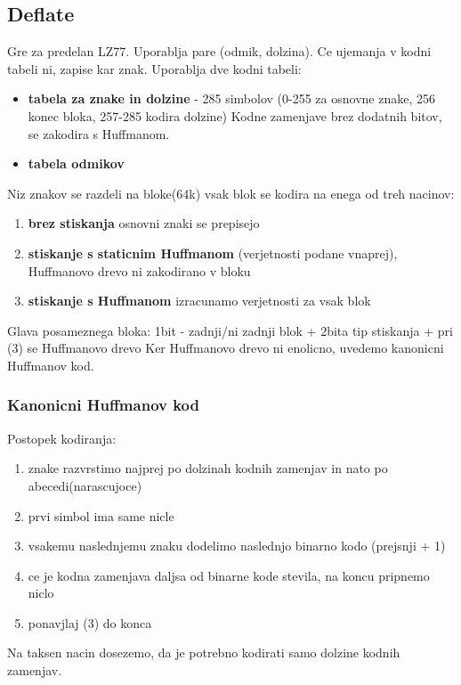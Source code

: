\documentclass{article}
\begin{document}
\begin{multicols}{2}
	\subsection{Deflate}
	Gre za predelan LZ77. Uporablja pare (odmik, dolzina). Ce ujemanja v kodni tabeli ni, zapise kar znak.
	Uporablja dve kodni tabeli:
	\begin{itemize}
		\item \textbf{tabela za znake in dolzine} - 285 simbolov
		      (0-255 za osnovne znake, 256 konec bloka, 257-285 kodira dolzine)
		      Kodne zamenjave brez dodatnih bitov, se zakodira s Huffmanom.
		\item \textbf{tabela odmikov}
	\end{itemize}
	Niz znakov se razdeli na bloke(64k)
	vsak blok se kodira na enega od treh nacinov:
	\begin{enumerate}
		\item \textbf{brez stiskanja} osnovni znaki se prepisejo
		\item \textbf{stiskanje s staticnim Huffmanom} (verjetnosti podane vnaprej), Huffmanovo drevo ni zakodirano v bloku
		\item \textbf{stiskanje s Huffmanom} izracunamo verjetnosti za vsak blok
	\end{enumerate}
	Glava posameznega bloka: 1bit - zadnji/ni zadnji blok + 2bita tip stiskanja + pri (3) se Huffmanovo drevo
	Ker Huffmanovo drevo ni enolicno, uvedemo kanonicni Huffmanov kod.

	\subsubsection{Kanonicni Huffmanov kod}
	Postopek kodiranja:
	\begin{enumerate}
		\item znake razvrstimo najprej po dolzinah kodnih zamenjav in nato po abecedi(narascujoce)
		\item prvi simbol ima same nicle
		\item vsakemu naslednjemu znaku dodelimo naslednjo binarno kodo (prejsnji + 1)
		\item ce je kodna zamenjava daljsa od binarne kode stevila, na koncu pripnemo niclo
		\item ponavjlaj (3) do konca
	\end{enumerate}
	Na taksen nacin dosezemo, da je potrebno kodirati samo dolzine kodnih zamenjav.


\end{multicols}
\end{document}
